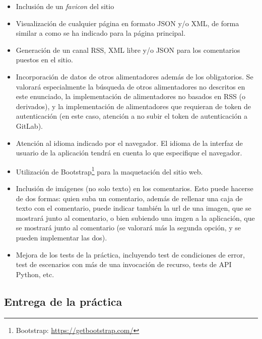 \begin{itemize}
  \item Inclusión de un \emph{favicon} del sitio
  
  \item Visualización de cualquier página en formato JSON y/o XML, de forma similar a como se ha indicado para la página principal.

  \item Generación de un canal RSS, XML libre y/o JSON para los comentarios puestos en el sitio.

  \item Incorporación de datos de otros alimentadores además de los obligatorios. Se valorará especialmente la búsqueda de otros alimentadores no descritos en este enunciado, la implementación de alimentadores no basados en RSS (o derivados), y la implementación de alimentadores que requieran de token de autenticación (en este caso, atención a no subir el token de autenticación a GitLab).
 
  \item Atención al idioma indicado por el navegador. El idioma de la interfaz de usuario de la aplicación tendrá en cuenta lo que especifique el navegador.

  \item Utilización de Bootstrap\footnote{Bootstrap: \url{https://getbootstrap.com/}} para la maquetación del sitio web.

  \item Inclusión de imágenes (no solo texto) en los comentarios. Esto puede hacerse de dos formas: quien suba un comentario, además de rellenar una caja de texto con el comentario, puede indicar también la url de una imagen, que se mostrará junto al comentario, o bien subiendo una imgen a la aplicación, que se mostrará junto al comentario (se valorará más la segunda opción, y se pueden implementar las dos).
    
  \item Mejora de los tests de la práctica, incluyendo test de condiciones de error, test de escenarios con más de una invocación de recurso, tests de API Python, etc.
\end{itemize}

\subsection{Entrega de la práctica}

